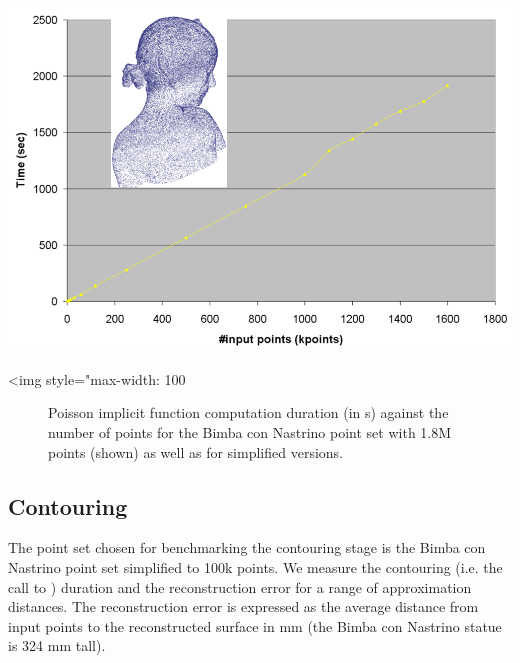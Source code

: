 \begin{center}
    \begin{ccTexOnly}
        \includegraphics[width=1.0\textwidth]{Surface_reconstruction_points_3/poisson_bench}
    \end{ccTexOnly}
    \begin{ccHtmlOnly}
        <img style="max-width: 100%
    \end{ccHtmlOnly}
    \begin{figure}[h]
        \caption{Poisson implicit function computation duration (in s)
                 against the number of points  for the Bimba con Nastrino
                 point set with 1.8M points (shown)
                 as well as for simplified versions.}
        \label{Surface_reconstruction_points_3-fig-poisson_bench}
    \end{figure}
\end{center}



\subsection{Contouring}

The point set chosen for benchmarking the contouring stage is the Bimba con Nastrino point set simplified to 100k points. We measure the contouring (i.e. the call to ) duration and the reconstruction error for a range of approximation distances.
The reconstruction error is expressed as the average distance from input points to the reconstructed surface in mm (the Bimba con Nastrino statue is 324 mm tall).

